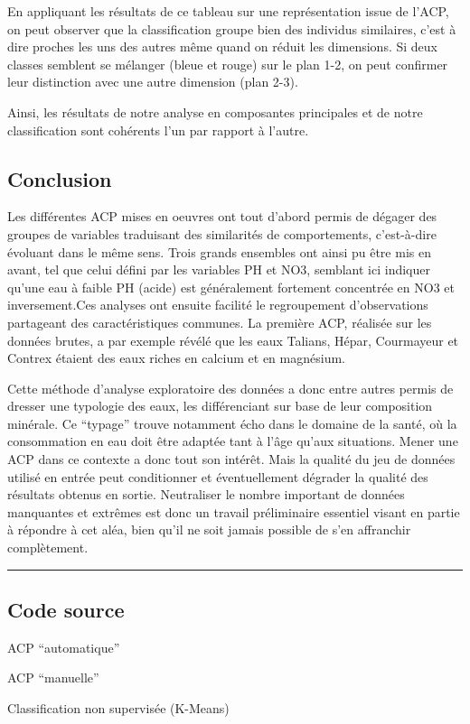 \documentclass[]{article}
\begin{document}
En appliquant les résultats de ce tableau sur une représentation issue
de l'ACP, on peut observer que la classification groupe bien des
individus similaires, c'est à dire proches les uns des autres même quand
on réduit les dimensions. Si deux classes semblent se mélanger (bleue et
rouge) sur le plan 1-2, on peut confirmer leur distinction avec une
autre dimension (plan 2-3).

Ainsi, les résultats de notre analyse en composantes principales et de
notre classification sont cohérents l'un par rapport à l'autre.

\hypertarget{conclusion}{\subsection{Conclusion}\label{conclusion}}

Les différentes ACP mises en oeuvres ont tout d'abord permis de dégager
des groupes de variables traduisant des similarités de comportements,
c'est-à-dire évoluant dans le même sens. Trois grands ensembles ont
ainsi pu être mis en avant, tel que celui défini par les variables PH et
NO3, semblant ici indiquer qu'une eau à faible PH (acide) est
généralement fortement concentrée en NO3 et inversement.Ces analyses ont
ensuite facilité le regroupement d'observations partageant des
caractéristiques communes. La première ACP, réalisée sur les données
brutes, a par exemple révélé que les eaux Talians, Hépar, Courmayeur et
Contrex étaient des eaux riches en calcium et en magnésium.

Cette méthode d'analyse exploratoire des données a donc entre autres
permis de dresser une typologie des eaux, les différenciant sur base de
leur composition minérale. Ce ``typage'' trouve notamment écho dans le
domaine de la santé, où la consommation en eau doit être adaptée tant à
l'âge qu'aux situations. Mener une ACP dans ce contexte a donc tout son
intérêt. Mais la qualité du jeu de données utilisé en entrée peut
conditionner et éventuellement dégrader la qualité des résultats obtenus
en sortie. Neutraliser le nombre important de données manquantes et
extrêmes est donc un travail préliminaire essentiel visant en partie à
répondre à cet aléa, bien qu'il ne soit jamais possible de s'en
affranchir complètement.

\begin{center}\rule{0.5\linewidth}{\linethickness}\end{center}

\hypertarget{code-source}{\subsection{Code source}\label{code-source}}

ACP ``automatique''

ACP ``manuelle''

Classification non supervisée (K-Means)
\end{document}

